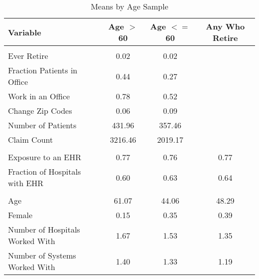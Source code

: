 \begin{table}[h]

\caption{Means by Age Sample}
\centering
\begin{tabular}[t]{lccc}
\toprule
Variable & Age $>$ 60 & Age $<=$ 60 & Any Who Retire\\
\midrule
\addlinespace[0.3em]
\multicolumn{4}{l}{\textbf{Outcomes}}\\
\hspace{1em}Ever Retire & 0.02 & 0.02\\
\hspace{1em}Fraction Patients in Office & 0.44 & 0.27 \\
\hspace{1em}Work in an Office & 0.78 & 0.52 \\
\hspace{1em}Change Zip Codes & 0.06 & 0.09 \\
\hspace{1em}Number of Patients & 431.96 & 357.46 \\
\hspace{1em}Claim Count & 3216.46 & 2019.17\\
\addlinespace[0.3em]
\multicolumn{4}{l}{\textbf{Treatment}}\\
\hspace{1em}Exposure to an EHR & 0.77 & 0.76 & 0.77\\
\hspace{1em}Fraction of Hospitals with EHR & 0.60 & 0.63 & 0.64\\
\addlinespace[0.3em]
\multicolumn{4}{l}{\textbf{Characteristics}}\\
\hspace{1em}Age & 61.07 & 44.06 & 48.29\\
\hspace{1em}Female & 0.15 & 0.35 & 0.39\\
\hspace{1em}Number of Hospitals Worked With & 1.67 & 1.53 & 1.35\\
\hspace{1em}Number of Systems Worked With & 1.40 & 1.33 & 1.19\\
\bottomrule
\end{tabular}
\label{tab:splitstats}
\end{table}

